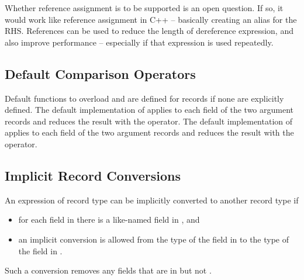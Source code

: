 \begin{openissue}
Whether reference assignment is to be supported is an open question.
If so, it would work like reference assignment in C++ -- basically creating an
alias for the RHS.
References can be used to reduce the length of dereference expression, and also
improve performance -- especially if that expression is used repeatedly.
\end{openissue}

\subsection{Default Comparison Operators}
\label{Record_Comparison_Operators}
Default functions to overload \chpl{==} and \chpl{\!=} are defined for
records if none are explicitly defined.
The default implementation of \chpl{==} applies \chpl{==} to each
field of the two argument records and reduces the result with
the \chpl{&&} operator.  The default implementation of \chpl{\!=}
applies \chpl{\!=} to each field of the two argument records and
reduces the result with the \chpl{||} operator.

\subsection{Implicit Record Conversions}
\label{Implicit_Record_Conversions}

An expression of record type  can be implicitly converted to
another record type  if

\begin{itemize}
\item for each field in  there is a like-named field in ,
      and
\item an implicit conversion is allowed from the type of the field in 
      to the type of the field in .
\end{itemize}
Such a conversion removes any fields that are in  but not .

